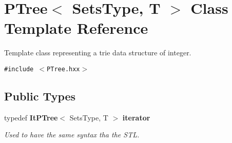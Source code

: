 \section{PTree$<$ Sets\-Type, T $>$ Class Template Reference}
\label{class_p_tree}
Template class representing a trie data structure of integer.  


{\tt \#include $<$PTree.hxx$>$}

\subsection*{Public Types}
\begin{CompactItemize}
\item 
typedef {\bf It\-PTree}$<$ Sets\-Type, T $>$ {\bf iterator}\label{class_p_tree_aa29b0935d154c06ff0dfcacbff2d683}

\begin{CompactList}\small\item\em Used to have the same syntax tha the STL. \item\end{CompactList}\end{CompactItemize}
